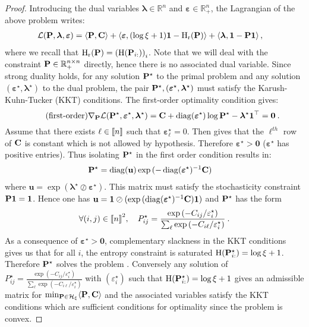 \begin{proof}
Introducing the dual variables $\bm{\lambda} \in \mathbb{R}^n$ and $\bm{\varepsilon} \in \mathbb{R}_+^n$, the Lagrangian of the above problem writes:
\begin{align}
    \mathcal{L}(\mathbf{P}, \bm{\lambda}, \bm{\varepsilon}) &= \langle \mathbf{P}, \mathbf{C} \rangle + \langle \bm{\varepsilon}, (\log{\xi}+1) \bm{1} - \operatorname{H}_{\mathrm{r}}(\mathbf{P}) \rangle + \langle \bm{\lambda}, \bm{1} - \mathbf{P} \bm{1} \rangle\,,
\end{align}
where we recall that $\operatorname{H}_{\mathrm{r}}(\mathbf{P}) = \left( \operatorname{H}(\mathbf{P}_{i:}) \right)_{i}$. Note that we will deal with the constraint $\mathbf{P} \in \mathbb{R}_+^{n \times n}$ directly, hence there is no associated dual variable. Since strong duality holds, for any solution $\mathbf{P}^\star$ to the primal problem and any solution $(\bm{\varepsilon}^\star, \bm{\lambda}^\star)$ to the dual problem, the pair $\mathbf{P}^\star, (\bm{\varepsilon}^\star, \bm{\lambda}^\star)$ must satisfy the Karush-Kuhn-Tucker (KKT) conditions. The first-order optimality condition gives:
\begin{equation}
\label{kkt_ea}
\tag{first-order}
    \nabla_{\mathbf{P}} \mathcal{L}(\mathbf{P}^\star, \bm{\varepsilon}^\star, \bm{\lambda}^\star) = \mathbf{C} + \operatorname{diag}(\bm{\varepsilon}^\star)\log{\mathbf{P}^\star} - \bm{\lambda}^\star \bm{1}^\top = \bm{0} \:.
\end{equation}
Assume that there exists $\ell \in {[\![n]\!]}$ such that $\bm{\varepsilon}_\ell^\star = 0$. Then  gives that the $\ell^{th}$ row of $\mathbf{C}$ is constant which is not allowed by hypothesis. Therefore $\bm{\varepsilon}^\star>\bm{0}$ (\ie $\bm{\varepsilon}^\star$ has positive entries). 
Thus isolating $\mathbf{P}^\star$ in the first order condition results in:
\begin{align}
    \mathbf{P}^\star &= \operatorname{diag}(\mathbf{u}) \exp{(-\operatorname{diag}(\bm{\varepsilon}^\star)^{-1}\mathbf{C})}
\end{align}
where $\mathbf{u} = \exp{(\bm{\lambda}^\star \oslash \bm{\varepsilon}^\star)}$.
This matrix must satisfy the stochasticity constraint $\mathbf{P} \bm{1}=\bm{1}$. Hence one has $\mathbf{u} = \bm{1} \oslash (\exp{(\operatorname{diag}(\bm{\varepsilon}^\star)^{-1}\mathbf{C})} \bm{1})$ and $\mathbf{P}^\star$ has the form
\begin{align}
    \forall (i,j) \in {[\![n]\!]}^2, \quad P^{\star}_{ij} = \frac{\exp{(-C_{ij}/\varepsilon^\star_i)}}{\sum_\ell \exp{(-C_{i\ell}/\varepsilon^\star_i)}} \:.
\end{align}
As a consequence of $\bm{\varepsilon}^\star \bm{>} \bm{0}$, complementary slackness in the KKT conditions gives us that for all $i$, the entropy constraint is saturated \ie $\operatorname{H}(\mathbf{P}^\star_{i:}) = \log{\xi} + 1$. Therefore $\mathbf{P}^\star$ solves the problem . Conversely any solution of  $P^{\star}_{ij} = \frac{\exp{(-C_{ij}/\varepsilon^\star_i)}}{\sum_\ell \exp{(-C_{i\ell}/\varepsilon^\star_i)}}$ with $(\varepsilon^\star_i)$ such that $\operatorname{H}(\mathbf{P}^\star_{i:}) = \log{\xi} + 1$  gives an admissible matrix for $\min_{\mathbf{P} \in \mathcal{H}_\xi} \langle \mathbf{P}, \mathbf{C} \rangle$ and the associated variables satisfy the KKT conditions which are sufficient conditions for optimality since the problem is convex.

\end{proof}
